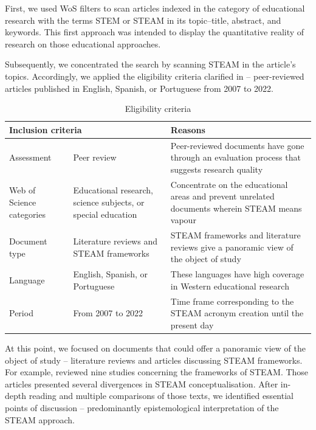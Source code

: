 \documentclass[english]{textolivre}
\begin{document}
First, we used WoS filters to scan articles indexed in the category of educational research with the terms STEM or STEAM in its topic–title, abstract, and keywords. This first approach was intended to display the quantitative reality of research on those educational approaches.

Subsequently, we concentrated the search by scanning STEAM in the article’s topics. Accordingly, we applied the eligibility criteria clarified in  – peer-reviewed articles published in English, Spanish, or Portuguese from 2007 to 2022.

\begin{table}[h!]
\centering
\small
\caption{Eligibility criteria}
\label{tab1}
\begin{tabular}{p{3.5cm}p{3.5cm}p{6.5cm}}
\toprule
\multicolumn{2}{l}{Inclusion criteria} & Reasons \\
\midrule
Assessment & Peer review & Peer-reviewed documents have gone through an evaluation process that suggests research quality \cite{ardoin_early_2020} \\ 

Web of Science categories & Educational research, science subjects, or special education & Concentrate on the 	educational areas and prevent unrelated documents wherein STEAM means vapour \\

Document type & Literature reviews and STEAM frameworks & STEAM frameworks and literature reviews give a panoramic view of the object of study \cite{prisma-p_group_preferred_2015} \\

Language & English, Spanish, or Portuguese & These languages have high coverage in Western educational research \\

Period & From 2007 to 2022 & Time frame corresponding to the STEAM acronym creation \cite{perignat_steam_2019} until the present day \\
\bottomrule
\end{tabular}
\end{table}

At this point, we focused on documents that could offer a panoramic view of the object of study – literature reviews and articles discussing STEAM frameworks. For example, \textcite{ortiz-revilla_mirada_2021} reviewed nine studies concerning the frameworks of STEAM. Those articles presented several divergences in STEAM conceptualisation. After in-depth reading and multiple comparisons of those texts, we identified essential points of discussion – predominantly epistemological interpretation of the STEAM approach.
\end{document}

